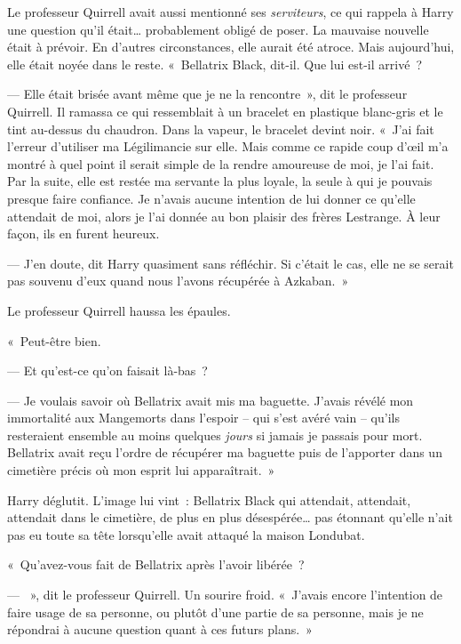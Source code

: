 Le professeur Quirrell avait aussi mentionné ses \emph{serviteurs}, ce qui rappela à Harry une question qu'il était… probablement obligé de poser.
La mauvaise nouvelle était à prévoir.
En d'autres circonstances, elle aurait été atroce.
Mais aujourd'hui, elle était noyée dans le reste.
«~Bellatrix Black, dit-il.
Que lui est-il arrivé~?

--- Elle était brisée avant même que je ne la rencontre~», dit le professeur Quirrell.
Il ramassa ce qui ressemblait à un bracelet en plastique blanc-gris et le tint au-dessus du chaudron.
Dans la vapeur, le bracelet devint noir.
«~J'ai fait l'erreur d'utiliser ma Légilimancie sur elle.
Mais comme ce rapide coup d'œil m'a montré à quel point il serait simple de la rendre amoureuse de moi, je l'ai fait.
Par la suite, elle est restée ma servante la plus loyale, la seule à qui je pouvais presque faire confiance.
Je n'avais aucune intention de lui donner ce qu'elle attendait de moi, alors je l'ai donnée au bon plaisir des frères Lestrange.
À leur façon, ils en furent heureux.

--- J'en doute, dit Harry quasiment sans réfléchir.
Si c'était le cas, elle ne se serait pas souvenu d'eux quand nous l'avons récupérée à Azkaban.~»

Le professeur Quirrell haussa les épaules.

«~Peut-être bien.

--- Et qu'est-ce qu'on faisait là-bas~?

--- Je voulais savoir où Bellatrix avait mis ma baguette.
J'avais révélé mon immortalité aux Mangemorts dans l'espoir -- qui s'est avéré vain -- qu'ils resteraient ensemble au moins quelques \emph{jours} si jamais je passais pour mort.
Bellatrix avait reçu l'ordre de récupérer ma baguette puis de l'apporter dans un cimetière précis où mon esprit lui apparaîtrait.~»

Harry déglutit.
L'image lui vint~: Bellatrix Black qui attendait, attendait, attendait dans le cimetière, de plus en plus désespérée… pas étonnant qu'elle n'ait pas eu toute sa tête lorsqu'elle avait attaqué la maison Londubat.

«~Qu'avez-vous fait de Bellatrix après l'avoir libérée~?

--- ~», dit le professeur Quirrell.
Un sourire froid.
«~J'avais encore l'intention de faire usage de sa personne, ou plutôt d'une partie de sa personne, mais je ne répondrai à aucune question quant à ces futurs plans.~»

